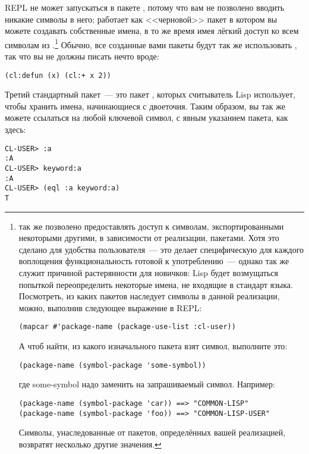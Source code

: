 REPL не может запускаться в пакете , потому что вам не позволено вводить
никакие символы в него;  работает как <<черновой>> пакет в котором вы
можете создавать собственные имена, в то же время имея лёгкий доступ ко всем символам из
.\footnote{ так же позволено предоставлять доступ
  к символам, экспортированными некоторыми другими, в зависимости от реализации,
  пакетами. Хотя это сделано для удобства пользователя~--- это делает специфическую для
  каждого воплощения функциональность готовой к употреблению~--- однако так же служит
  причиной растерянности для новичков: Lisp будет возмущаться попыткой переопределить
  некоторые имена, не входящие в стандарт языка. Посмотреть, из каких пакетов
   наследует символы в данной реализации, можно, выполнив следующее
  выражение в REPL:

\begin{lstlisting}
(mapcar #'package-name (package-use-list :cl-user))
\end{lstlisting}

А чтоб найти, из какого изначального пакета взят символ, выполните это:

\begin{lstlisting}
(package-name (symbol-package 'some-symbol))
\end{lstlisting}

\noindent{}где some-symbol надо заменить на запрашиваемый символ. Например:

\begin{lstlisting}
(package-name (symbol-package 'car)) ==> "COMMON-LISP"
(package-name (symbol-package 'foo)) ==> "COMMON-LISP-USER"
\end{lstlisting}

Символы, унаследованные от пакетов, определённых вашей реализацией, возвратят несколько
другие значения.} Обычно, все созданные вами пакеты будут так же использовать
, так что вы не должны писать нечто вроде:

\begin{lstlisting}
(cl:defun (x) (cl:+ x 2))
\end{lstlisting}

Третий стандартный пакет~--- это пакет , которых считыватель Lisp
использует, чтобы хранить имена, начинающиеся с двоеточия. Таким образом, вы так же можете
ссылаться на любой ключевой символ, с явным указанием пакета, как здесь:

\begin{lstlisting}
CL-USER> :a
:A
CL-USER> keyword:a
:A
CL-USER> (eql :a keyword:a)
T
\end{lstlisting}

